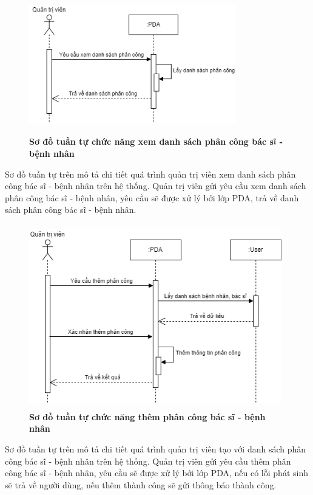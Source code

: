 \begin{figure}[H]
  \centering
  \includegraphics[width=9cm,height=6cm]{Images/sequence/sequence_manage_pda.png}
  \caption[Sơ đồ tuần tự chức năng xem danh sách phân công bác sĩ - bệnh nhân]{\bfseries \fontsize{12pt}{0pt}
  \selectfont Sơ đồ tuần tự chức năng xem danh sách phân công bác sĩ - bệnh nhân}
  \label{sequence_manage_pda} %
\end{figure}
Sơ đồ tuần tự trên mô tả chi tiết quá trình quản trị viên xem danh sách phân công bác sĩ - bệnh nhân trên hệ thống. Quản trị viên gửi yêu cầu
xem danh sách phân công bác sĩ - bệnh nhân, yêu cầu sẽ được xử lý bởi lớp PDA, trả về danh sách phân công bác sĩ - bệnh nhân. 

\begin{figure}[H]
  \centering
  \includegraphics[width=11cm,height=8cm]{Images/sequence/sequence_manage_add_pda.png}
  \caption[Sơ đồ tuần tự chức năng thêm phân công bác sĩ - bệnh nhân]{\bfseries \fontsize{12pt}{0pt}
  \selectfont Sơ đồ tuần tự chức năng thêm phân công bác sĩ - bệnh nhân}
  \label{sequence_manage_add_pda} %
\end{figure}
Sơ đồ tuần tự trên mô tả chi tiết quá trình quản trị viên tạo với danh sách phân công bác sĩ - bệnh nhân trên hệ thống. Quản trị viên gửi yêu cầu
thêm phân công bác sĩ - bệnh nhân, yêu cầu sẽ được xử lý bởi lớp PDA, nếu có lỗi phát sinh sẽ trả về người dùng, nếu thêm thành công sẽ gửi thông báo thành công.

